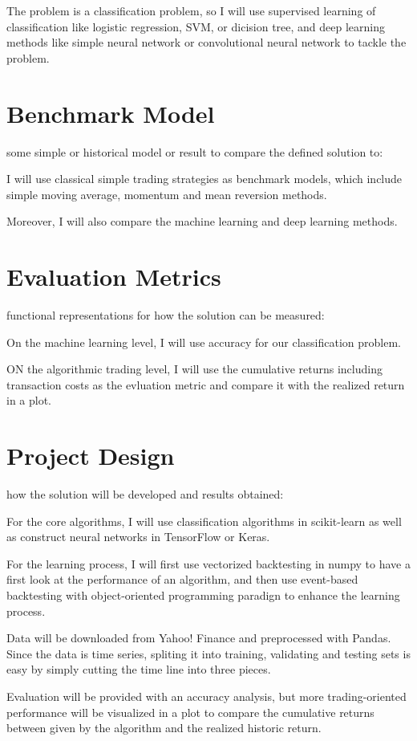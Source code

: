 \documentclass[11pt]{article} %
\begin{document}
The problem is a classification problem, so I will use supervised learning of classification like logistic regression, SVM, or dicision tree, and deep learning methods like simple neural network or convolutional neural network to tackle the problem.


\section{Benchmark Model}
some simple or historical model or result to compare the defined solution to: 

I will use classical simple trading strategies as benchmark models, which include simple moving average, momentum and mean reversion methods. 

Moreover, I will also compare the machine learning and deep learning methods. 


\section{Evaluation Metrics}
functional representations for how the solution can be measured: 

On the machine learning level, I will use accuracy for our classification problem.

ON the algorithmic trading level, I will use the cumulative returns including transaction costs as the evluation metric and compare it with the realized return in a plot.


\section{Project Design}
how the solution will be developed and results obtained: 

For the core algorithms, I will use classification algorithms in scikit-learn as well as construct neural networks in TensorFlow or Keras.

For the learning process, I will first use vectorized backtesting in numpy to have a first look at the performance of an algorithm, and then use event-based backtesting with object-oriented programming paradign to enhance the learning process.

Data will be downloaded from Yahoo! Finance and preprocessed with Pandas. Since the data is time series, spliting it into training, validating and testing sets is easy by simply cutting the time line into three pieces.

Evaluation will be provided with an accuracy analysis, but more trading-oriented performance will be visualized in a plot to compare the cumulative returns between given by the algorithm and the realized historic return.
\end{document}

